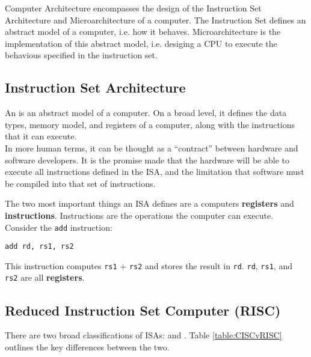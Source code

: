 
Computer Architecture encompasses the design of the Instruction Set Architecture and Microarchitecture of a computer. The Instruction Set defines an abstract model of a computer, i.e. how it behaves. Microarchitecture is the implementation of this abstract model, i.e. desiging a CPU to execute the behavious specified in the instruction set.



\subsection{Instruction Set Architecture}
    An  is an abstract model of a computer. On a broad level, it defines the data types, memory model, and registers of a computer, along with the instructions that it can execute. \\
    In more human terms, it can be thought as a ``contract'' between hardware and software developers. It is the promise made that the hardware will be able to execute all instructions defined in the \gls{ISA}, and the limitation that software must be compiled into that set of instructions.

    

    The two most important things an \gls{ISA} defines are a computers \textbf{registers} and \textbf{instructions}. Instructions are the operations the computer can execute. Consider the \texttt{add} instruction: 

    \begin{centering}
    \texttt{add rd, rs1, rs2}
    \end{centering}

    This instruction computes \texttt{rs1} $+$ \texttt{rs2} and stores the result in \texttt{rd}.  \texttt{rd}, \texttt{rs1}, and \texttt{rs2} are all \textbf{registers}.
    
\subsection{Reduced Instruction Set Computer (RISC)}
    There are two broad classifications of \glspl{ISA}:  and . Table \ref{table:CISCvRISC} outlines the key differences between the two.

    

